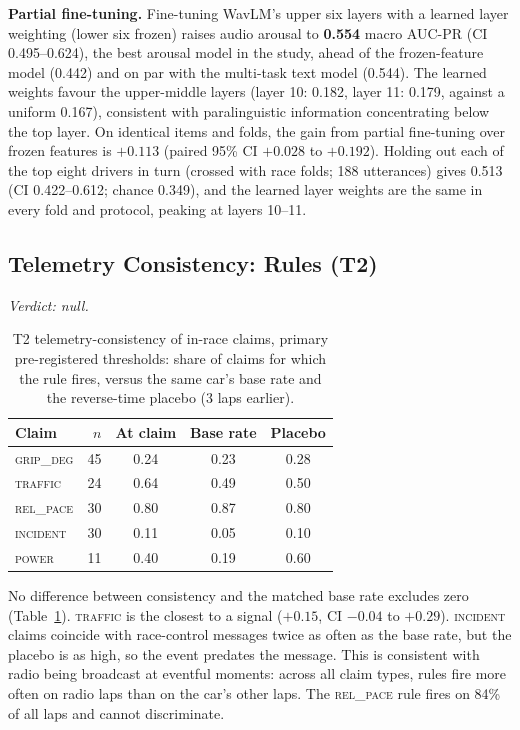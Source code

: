 \textbf{Partial fine-tuning.} Fine-tuning WavLM's upper six layers with a learned layer weighting (lower six frozen) raises audio arousal to \textbf{0.554} macro AUC-PR (CI 0.495--0.624), the best arousal model in the study, ahead of the frozen-feature model (0.442) and on par with the multi-task text model (0.544). The learned weights favour the upper-middle layers (layer 10: 0.182, layer 11: 0.179, against a uniform 0.167), consistent with paralinguistic information concentrating below the top layer. On identical items and folds, the gain from partial fine-tuning over frozen features is $+0.113$ (paired 95\% CI $+0.028$ to $+0.192$). Holding out each of the top eight drivers in turn (crossed with race folds; 188 utterances) gives 0.513 (CI 0.422--0.612; chance 0.349), and the learned layer weights are the same in every fold and protocol, peaking at layers 10--11.

\subsection{Telemetry Consistency: Rules (T2)}
\emph{Verdict: null.}

\begin{table}[t]
\centering
\caption{T2 telemetry-consistency of in-race claims, primary pre-registered thresholds: share of claims for which the rule fires, versus the same car's base rate and the reverse-time placebo (3 laps earlier).}
\label{tab:t2}
\begin{tabular}{lrccc}
\toprule
Claim & $n$ & At claim & Base rate & Placebo \\
\midrule
\textsc{grip\_deg} & 45 & 0.24 & 0.23 & 0.28 \\
\textsc{traffic} & 24 & 0.64 & 0.49 & 0.50 \\
\textsc{rel\_pace} & 30 & 0.80 & 0.87 & 0.80 \\
\textsc{incident} & 30 & 0.11 & 0.05 & 0.10 \\
\textsc{power} & 11 & 0.40 & 0.19 & 0.60 \\
\bottomrule
\end{tabular}
\end{table}
No difference between consistency and the matched base rate excludes zero (Table~\ref{tab:t2}). \textsc{traffic} is the closest to a signal ($+0.15$, CI $-0.04$ to $+0.29$). \textsc{incident} claims coincide with race-control messages twice as often as the base rate, but the placebo is as high, so the event predates the message. This is consistent with radio being broadcast at eventful moments: across all claim types, rules fire more often on radio laps than on the car's other laps. The \textsc{rel\_pace} rule fires on 84\% of all laps and cannot discriminate.

